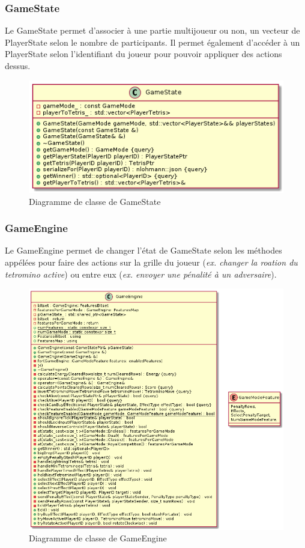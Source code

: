 \documentclass{article}
\begin{document}
\subsubsection*{GameState}

Le GameState permet d'associer à une partie multijoueur ou non, un vecteur de PlayerState selon le nombre de participants. Il permet également d'accéder à un PlayerState selon l'identifiant du joueur pour pouvoir appliquer des actions dessus.

\begin{figure}[!h]
	\centering
	 \includegraphics[scale=0.6]{../res/uml/class/GameStateClass.png}
	 \caption{Diagramme de classe de GameState}
	 \label{fig:GameStateDiagram}
\end{figure}


\subsubsection*{GameEngine}

Le GameEngine permet de changer l'état de GameState selon les méthodes appélées pour faire des actions sur la grille du joueur (\textit{ex. changer la roation du tetromino active}) ou entre eux (\textit{ex. envoyer une pénalité à un adversaire}). 

\begin{figure}[H]
	\centering
	 \includegraphics[scale=0.5]{../res/uml/class/GameEngineClass.png}
	 \caption{Diagramme de classe de GameEngine}
	 \label{fig:GameEngine}
\end{figure}
\end{document}
